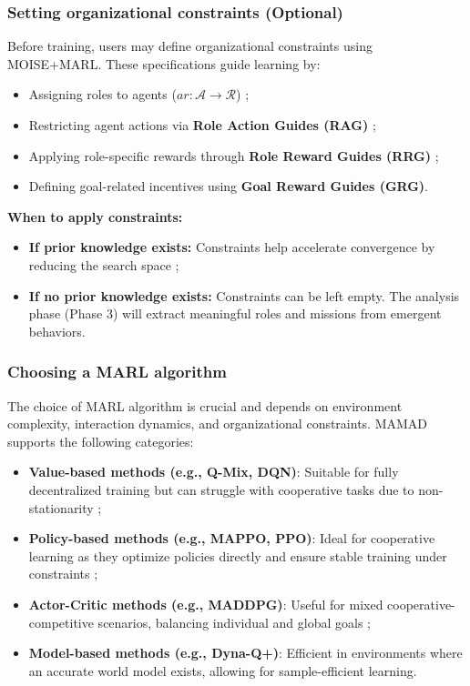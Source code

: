 \documentclass[journal]{IEEEtai}
\begin{document}
\subsubsection{Setting organizational constraints (Optional)}
Before training, users may define organizational constraints using MOISE+MARL. These specifications guide learning by:
\begin{itemize}
    \item Assigning roles to agents ($ar: \mathcal{A} \to \mathcal{R}$) ;
    \item Restricting agent actions via \textbf{Role Action Guides (RAG)} ;
    \item Applying role-specific rewards through \textbf{Role Reward Guides (RRG)} ;
    \item Defining goal-related incentives using \textbf{Goal Reward Guides (GRG)}.
\end{itemize}

\noindent \textbf{When to apply constraints:}
\begin{itemize}
    \item \textbf{If prior knowledge exists:} Constraints help accelerate convergence by reducing the search space ;
    \item \textbf{If no prior knowledge exists:} Constraints can be left empty. The analysis phase (Phase 3) will extract meaningful roles and missions from emergent behaviors.
\end{itemize}

\subsubsection{Choosing a MARL algorithm}
The choice of MARL algorithm is crucial and depends on environment complexity, interaction dynamics, and organizational constraints. MAMAD supports the following categories:

\begin{itemize}
    \item \textbf{Value-based methods (e.g., Q-Mix, DQN)}: Suitable for fully decentralized training but can struggle with cooperative tasks due to non-stationarity ;
    \item \textbf{Policy-based methods (e.g., MAPPO, PPO)}: Ideal for cooperative learning as they optimize policies directly and ensure stable training under constraints ;
    \item \textbf{Actor-Critic methods (e.g., MADDPG)}: Useful for mixed cooperative-competitive scenarios, balancing individual and global goals ;
    \item \textbf{Model-based methods (e.g., Dyna-Q+)}: Efficient in environments where an accurate world model exists, allowing for sample-efficient learning.
\end{itemize}
\end{document}

